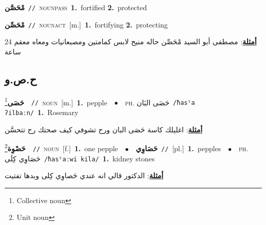 \documentclass[10pt,a4paper,twoside]{article} %
\begin{document}
\begin{multicols}{2}
{\setlength\topsep{0pt}\textbf{\foreignlanguage{arabic}{مْحَصَّن}}\ {\color{gray}\texttt{//}\color{black}}\ \textsc{noun\textunderscore pass}\ \textbf{1.}~fortified  \textbf{2.}~protected\ } \vspace{2mm}

{\setlength\topsep{0pt}\textbf{\foreignlanguage{arabic}{مْحَصِّن}}\ {\color{gray}\texttt{//}\color{black}}\ \textsc{noun\textunderscore act}\ [m.]\ \textbf{1.}~fortifying  \textbf{2.}~protecting\  \begin{flushright}\color{gray}\foreignlanguage{arabic}{\textbf{\underline{\foreignlanguage{arabic}{أمثلة}}}: مصطفى أبو السيد مْحَصِّن حاله منيح لابس كمامتين ومصبعانيات ومعاه معقم 24 ساعة}\end{flushright}\color{black}} \vspace{2mm}

\vspace{-3mm}
\subsection*{\color{blue}\foreignlanguage{arabic}{ح.ص.و}\color{blue}{}} 

{\setlength\topsep{0pt}\textbf{\foreignlanguage{arabic}{حَصَى}}\footnote{Collective noun}\ \ {\color{gray}\texttt{//}\color{black}}\ \textsc{noun}\ [m.]\ \textbf{1.}~pepple\ \ $\bullet$\ \ \textsc{ph.} \color{gray} \foreignlanguage{arabic}{حَصَى البَان}\color{black}\ {\color{gray}\texttt{/{\sffamily ħasˤa ʔilbaːn}/}\color{black}}\ \textbf{1.}~Rosemary\  \begin{flushright}\color{gray}\foreignlanguage{arabic}{\textbf{\underline{\foreignlanguage{arabic}{أمثلة}}}: اغليلك كاسة حَصَى البان ورح تشوفي كيف صحتك رح تتحسَّن}\end{flushright}\color{black}} \vspace{2mm}

{\setlength\topsep{0pt}\textbf{\foreignlanguage{arabic}{حَصْوِة}}\footnote{Unit noun}\ \ {\color{gray}\texttt{//}\color{black}}\ \textsc{noun}\ [f.]\ \textbf{1.}~one pepple\ \ $\bullet$\ \ \setlength\topsep{0pt}\textbf{\foreignlanguage{arabic}{حَصَاوِي}}\ {\color{gray}\texttt{//}\color{black}}\ [pl.]\ \textbf{1.}~pepples\ \ $\bullet$\ \ \textsc{ph.} \color{gray} \foreignlanguage{arabic}{حَصَاوِي كِلَى}\color{black}\ {\color{gray}\texttt{/{\sffamily ħasˤaːwi kila}/}\color{black}}\ \textbf{1.}~kidney stones\  \begin{flushright}\color{gray}\foreignlanguage{arabic}{\textbf{\underline{\foreignlanguage{arabic}{أمثلة}}}: الدكتور قالي انه عندي حَصاوِي كِلى وبدها تفتيت}\end{flushright}\color{black}} \vspace{2mm}


\end{multicols}
\end{document}
